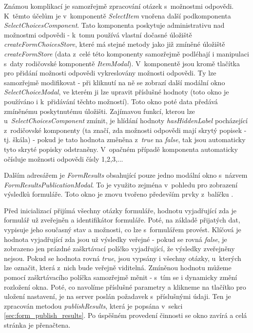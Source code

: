 			Známou komplikací je samozřejmě zpracování otázek s~možnostmi odpovědi. K~těmto účelům je v~komponentě \textit{SelectItem} vnořena další podkomponenta \textit{SelectChoicesComponent}. Tato komponenta poskytuje administrativu nad možnostmi odpovědi - k~tomu používá vlastní dočasné úložiště \textit{createFormChoicesStore}, které má stejné metody jako již zmíněné úložiště \textit{createFormStore} (data z~celé této komponenty samozřejmě podléhají i manipulaci s~daty rodičovské komponentě \textit{ItemModal}). V~komponentě jsou kromě tlačítka pro přidání možnosti odpovědi vykreslovány možnosti odpovědi. Ty lze samozřejmě modifikovat - při kliknutí na ně se zobrazí další modální okno \textit{SelectChoiceModal}, ve kterém ji lze upravit příslušné hodnoty (toto okno je používáno i k~přidávání těchto možností). Toto okno poté data předává zmíněnému poskytnutému úložišti. Zajímavou funkcí, kterou lze u~\textit{SelectChoicesComponent} zmínit, je hlídání hodnoty \textit{hasHiddenLabel} pocházející z~rodičovské komponenty (ta značí, zda možnosti odpovědi mají skrytý popisek - tj. škála) - pokud je tato hodnota změněna z~\textit{true} na \textit{false}, tak jsou automaticky tyto skryté popisky odstraněny. V~opačném případě komponenta automaticky očísluje možnosti odpovědi čísly 1,2,3,...
			
			\label{sec:modalni_okna_vysledky_form}
			Dalším adresářem je \textit{FormResults} obsahující pouze jedno modální okno s~názvem \textit{FormResultsPublicationModal}. To je využito zejména v~pohledu pro zobrazení výsledků formuláře. Toto okno je znovu tvořeno především prvky z~balíčku . 
			
			Před inicializací přijímá všechny otázky formuláře, hodnotu vyjadřující zda je formulář už zveřejněn a identifikátor formuláře. Poté, na základě přijatých dat, vypisuje jeho současný stav a možnosti, co lze s~formulářem provést. Klíčová je hodnota vyjadřující zda jsou už výsledky veřejné - pokud se rovná \textit{false}, je zobrazeno jen prázdné zaškrtávací políčko vyjadřující, že výsledky zveřejněny nejsou. Pokud se hodnota rovná \textit{true}, jsou vypsány i všechny otázky, u~kterých lze označit, která z~nich bude veřejně viditelná. Zmíněnou hodnotu můžeme pomocí zaškrtávacího políčka samozřejmě měnit - s~tím se i dynamicky změní rozložení okna. Poté, co navolíme příslušné parametry a klikneme na tlačítko pro uložení nastavení, je na server poslán požadavek s~příslušnými údaji. Ten je zpracován metodou \textit{publishResults}, která je popsána v~sekci \ref{sec:form_publish_results}. Po úspěšném provedení činnosti se okno zavírá a celá stránka je přenačtena.
			
